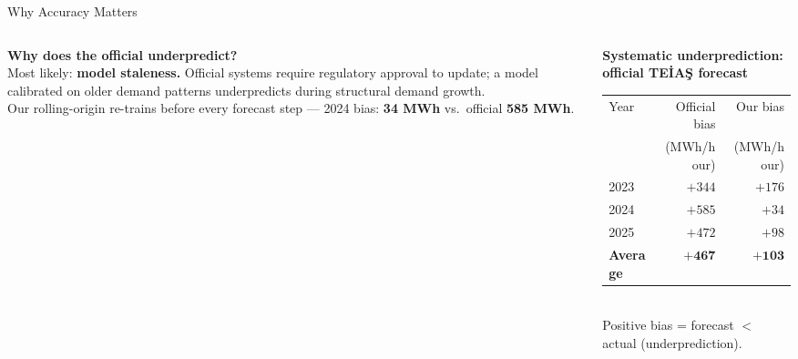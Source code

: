 \documentclass[10pt,aspectratio=169]{beamer}
\begin{document}
\begin{frame}{Why Accuracy Matters}
\begin{columns}
\begin{column}{0.44\textwidth}
      \vspace{0.5em}
      \textbf{Why does the official underpredict?}\\[0.3em]
      \small Most likely: \textbf{model staleness.} Official systems require
      regulatory approval to update; a model calibrated on older demand
      patterns underpredicts during structural demand growth.\\[0.2em]
      Our rolling-origin re-trains before every forecast step ---
      2024 bias: \textbf{34 MWh} vs.\ official \textbf{585 MWh}.
    \end{column}
    \begin{column}{0.53\textwidth}
      \begin{center}
        \small\textbf{Systematic underprediction: official TEİAŞ forecast}\\[0.4em]
        \begin{tabular}{lrr}
          \toprule
          Year & Official bias & Our bias \\
               & (MWh/hour) & (MWh/hour) \\
          \midrule
          2023 & $+344$ & $+176$ \\
          2024 & $+585$ & $+34$  \\
          2025 & $+472$ & $+98$  \\
          \midrule
          \textbf{Average} & $\mathbf{+467}$ & $\mathbf{+103}$ \\
          \bottomrule
        \end{tabular}\\[0.4em]
        \small Positive bias = forecast $<$ actual (underprediction).
      \end{center}
    \end{column}
  \end{columns}
\end{frame}
\end{document}
